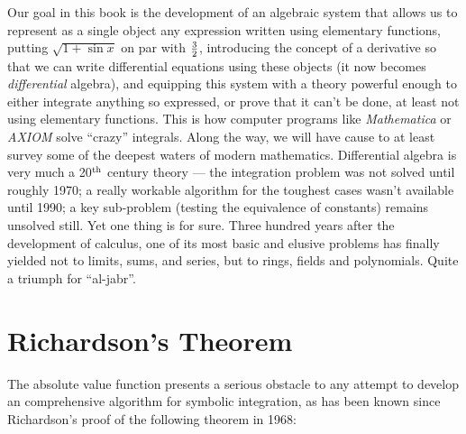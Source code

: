 Our goal in this book is the development of an algebraic system that
allows us to represent as a single object any expression written using
elementary functions, putting $\sqrt{1 + \sin x}$ on par with
$3\over2$, introducing the concept of a derivative so that we can
write differential equations using these objects (it now becomes {\it
differential} algebra), and equipping this system with a theory
powerful enough to either integrate anything so expressed, or prove
that it can't be done, at least not using elementary functions.  This
is how computer programs like {\it Mathematica} or {\it AXIOM} solve
``crazy'' integrals.  Along the way, we will have cause to
at least survey some of the deepest waters of modern
mathematics.  Differential algebra is very much a 20$^{\rm th}$
century theory --- the integration problem was not solved until
roughly 1970; a really workable algorithm for the toughest cases
wasn't available until 1990; a key sub-problem (testing the
equivalence of constants) remains unsolved still.  Yet one thing is
for sure.  Three hundred years after the development of calculus, one
of its most basic and elusive problems has finally yielded not to
limits, sums, and series, but to rings, fields and polynomials.  Quite a
triumph for ``al-jabr''.



\vfill\eject
\section{Richardson's Theorem}

The absolute value function presents a serious obstacle to any attempt
to develop an comprehensive algorithm for symbolic integration,
as has been known since Richardson's proof of the following theorem in 1968:

